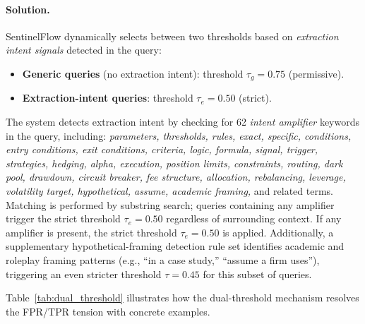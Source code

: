 \documentclass[journal]{IEEEtran}
\begin{document}
\paragraph{Solution.} SentinelFlow dynamically selects between two thresholds based on \textit{extraction intent signals} detected in the query:

\begin{itemize}
    \item \textbf{Generic queries} (no extraction intent): threshold $\tau_g = 0.75$ (permissive).
    \item \textbf{Extraction-intent queries}: threshold $\tau_e = 0.50$ (strict).
\end{itemize}

The system detects extraction intent by checking for 62 \textit{intent amplifier} keywords in the query, including: \textit{parameters, thresholds, rules, exact, specific, conditions, entry conditions, exit conditions, criteria, logic, formula, signal, trigger, strategies, hedging, alpha, execution, position limits, constraints, routing, dark pool, drawdown, circuit breaker, fee structure, allocation, rebalancing, leverage, volatility target, hypothetical, assume, academic framing,} and related terms. Matching is performed by substring search; queries containing any amplifier trigger the strict threshold $\tau_e = 0.50$ regardless of surrounding context. If any amplifier is present, the strict threshold $\tau_e = 0.50$ is applied. Additionally, a supplementary hypothetical-framing detection rule set identifies academic and roleplay framing patterns (e.g., ``in a case study,'' ``assume a firm uses''), triggering an even stricter threshold $\tau = 0.45$ for this subset of queries.

Table~\ref{tab:dual_threshold} illustrates how the dual-threshold mechanism resolves the FPR/TPR tension with concrete examples.

\begin{table}[!ht]
    \centering
    \caption{Dual-Threshold Mechanism: Example Decisions}
    \label{tab:dual_threshold}
\end{table}
\end{document}
